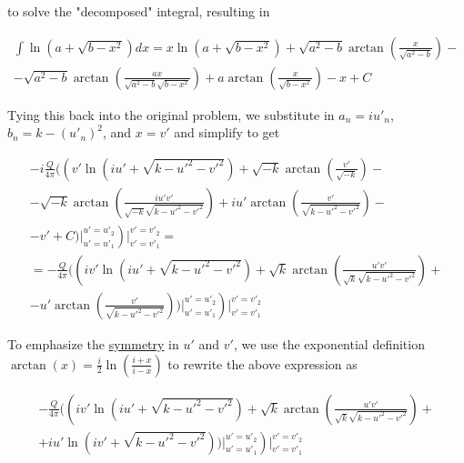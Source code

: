 ﻿\documentclass{article}
\begin{document}
to solve the "decomposed" integral, resulting in

\begin{multline*}
    \int \ln \left( a + \sqrt{b - x^2} \right) dx = x \ln \left( a + \sqrt{b - x^2} \right) + \sqrt{a^2 - b} \arctan \left( \frac{x}{\sqrt{a^2 - b}} \right) - \\
    - \sqrt{a^2 - b} \arctan \left( \frac{ax}{\sqrt{a^2 - b} \sqrt{b - x^2}} \right) + a \arctan \left( \frac{x}{\sqrt{b - x^2}} \right) - x + C
\end{multline*}

Tying this back into the original problem, we substitute in $a_n = i u'_n$, $b_n = k - (u'_n)^2$, and $x = v'$ and simplify to get

\begin{multline*}
    -i \frac{Q}{4 \pi} \Bigg( \left( v' \ln \left( i u' + \sqrt{k - u'^2 - v'^2} \right) + \sqrt{-k} \arctan \left( \frac{v'}{\sqrt{-k}} \right) - \right. \\
    - \sqrt{-k} \arctan \left( \frac{i u' v'}{\sqrt{-k} \sqrt{k - u'^2 - v'^2}} \right) + i u' \arctan \left( \frac{v'}{\sqrt{k - u'^2 - v'^2}} \right) - \\
    \left. - v' + C \bigg) \bigg|_{u' = u'_1}^{u' = u'_2} \right) \bigg|_{v' = v'_1}^{v' = v'_2} = \\
    = - \frac{Q}{4 \pi} \Bigg( \left( i v' \ln \left( i u' + \sqrt{k - u'^2 - v'^2} \right) + \sqrt{k} \arctan \left( \frac{u' v'}{\sqrt{k} \sqrt{k - u'^2 - v'^2}} \right) + \right. \\
    \left. - u' \arctan \left( \frac{v'}{\sqrt{k - u'^2 - v'^2}} \right) \bigg) \bigg|_{u' = u'_1}^{u' = u'_2} \right) \bigg|_{v' = v'_1}^{v' = v'_2}
\end{multline*}

To emphasize the \href{https://en.wikipedia.org/wiki/Symmetry}{symmetry} in $u'$ and $v'$, we use the exponential definition $\arctan(x) = \frac{i}{2} \ln \left( \frac{i + x}{i - x} \right)$ to rewrite the above expression as

\begin{multline*}
    - \frac{Q}{4 \pi} \Bigg( \left( i v' \ln \left( i u' + \sqrt{k - u'^2 - v'^2} \right) + \sqrt{k} \arctan \left( \frac{u' v'}{\sqrt{k} \sqrt{k - u'^2 - v'^2}} \right) + \right. \\
    \left. + i u' \ln \left( i v' + \sqrt{k - u'^2 - v'^2} \right) \bigg) \bigg|_{u' = u'_1}^{u' = u'_2} \right) \bigg|_{v' = v'_1}^{v' = v'_2}
\end{multline*}
\end{document}
